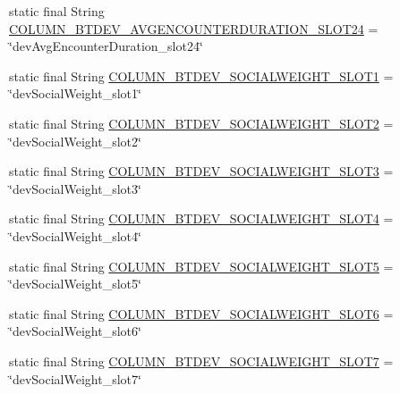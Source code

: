 \begin{DoxyCompactItemize}
\item 
static final String \hyperlink{classcs_1_1usense_1_1db_1_1_usense_s_q_lite_helper_a51f5dff62a1d662f7f9599cde9c6836d}{C\+O\+L\+U\+M\+N\+\_\+\+B\+T\+D\+E\+V\+\_\+\+A\+V\+G\+E\+N\+C\+O\+U\+N\+T\+E\+R\+D\+U\+R\+A\+T\+I\+O\+N\+\_\+\+S\+L\+O\+T24} = \char`\"{}dev\+Avg\+Encounter\+Duration\+\_\+slot24\char`\"{}
\item 
static final String \hyperlink{classcs_1_1usense_1_1db_1_1_usense_s_q_lite_helper_ace65d564b260a05a185289dad7bf6f31}{C\+O\+L\+U\+M\+N\+\_\+\+B\+T\+D\+E\+V\+\_\+\+S\+O\+C\+I\+A\+L\+W\+E\+I\+G\+H\+T\+\_\+\+S\+L\+O\+T1} = \char`\"{}dev\+Social\+Weight\+\_\+slot1\char`\"{}
\item 
static final String \hyperlink{classcs_1_1usense_1_1db_1_1_usense_s_q_lite_helper_a29547f3a66a3b685b1cfc7f5e09d351c}{C\+O\+L\+U\+M\+N\+\_\+\+B\+T\+D\+E\+V\+\_\+\+S\+O\+C\+I\+A\+L\+W\+E\+I\+G\+H\+T\+\_\+\+S\+L\+O\+T2} = \char`\"{}dev\+Social\+Weight\+\_\+slot2\char`\"{}
\item 
static final String \hyperlink{classcs_1_1usense_1_1db_1_1_usense_s_q_lite_helper_a6e3cc2817324d8f6cfe77246b1a3369d}{C\+O\+L\+U\+M\+N\+\_\+\+B\+T\+D\+E\+V\+\_\+\+S\+O\+C\+I\+A\+L\+W\+E\+I\+G\+H\+T\+\_\+\+S\+L\+O\+T3} = \char`\"{}dev\+Social\+Weight\+\_\+slot3\char`\"{}
\item 
static final String \hyperlink{classcs_1_1usense_1_1db_1_1_usense_s_q_lite_helper_ad33b471ce83418cd13fa678cdd1c6905}{C\+O\+L\+U\+M\+N\+\_\+\+B\+T\+D\+E\+V\+\_\+\+S\+O\+C\+I\+A\+L\+W\+E\+I\+G\+H\+T\+\_\+\+S\+L\+O\+T4} = \char`\"{}dev\+Social\+Weight\+\_\+slot4\char`\"{}
\item 
static final String \hyperlink{classcs_1_1usense_1_1db_1_1_usense_s_q_lite_helper_a215d55a30924a8ee18e46ca2d5ac3e8d}{C\+O\+L\+U\+M\+N\+\_\+\+B\+T\+D\+E\+V\+\_\+\+S\+O\+C\+I\+A\+L\+W\+E\+I\+G\+H\+T\+\_\+\+S\+L\+O\+T5} = \char`\"{}dev\+Social\+Weight\+\_\+slot5\char`\"{}
\item 
static final String \hyperlink{classcs_1_1usense_1_1db_1_1_usense_s_q_lite_helper_aabc755c88b637b8577cefb2299b23101}{C\+O\+L\+U\+M\+N\+\_\+\+B\+T\+D\+E\+V\+\_\+\+S\+O\+C\+I\+A\+L\+W\+E\+I\+G\+H\+T\+\_\+\+S\+L\+O\+T6} = \char`\"{}dev\+Social\+Weight\+\_\+slot6\char`\"{}
\item 
static final String \hyperlink{classcs_1_1usense_1_1db_1_1_usense_s_q_lite_helper_a27b438cb885971afa81a27739fd24e28}{C\+O\+L\+U\+M\+N\+\_\+\+B\+T\+D\+E\+V\+\_\+\+S\+O\+C\+I\+A\+L\+W\+E\+I\+G\+H\+T\+\_\+\+S\+L\+O\+T7} = \char`\"{}dev\+Social\+Weight\+\_\+slot7\char`\"{}
\item 

\end{DoxyCompactItemize}
